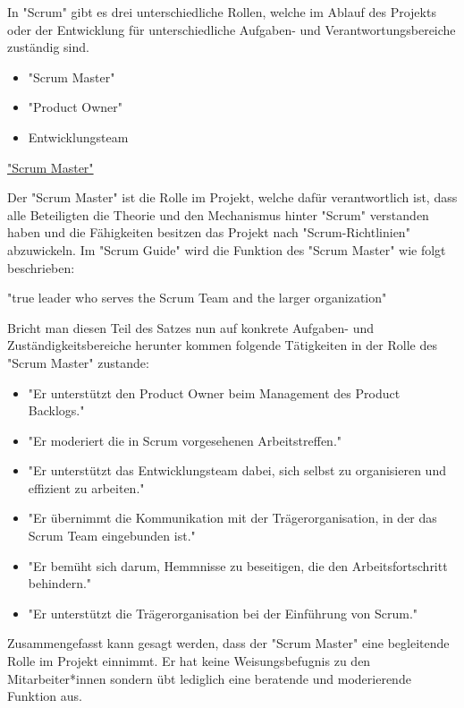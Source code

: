 
In "Scrum" gibt es drei unterschiedliche Rollen, welche im Ablauf des Projekts oder der Entwicklung für unterschiedliche Aufgaben- und Verantwortungsbereiche zuständig sind.

\begin{itemize}
    \item "Scrum Master"
    \item "Product Owner"
    \item Entwicklungsteam
\end{itemize}

\cite{Scrum}

\underline{"Scrum Master"}

Der "Scrum Master" ist die Rolle im Projekt, welche dafür verantwortlich ist, dass alle Beteiligten die Theorie und den Mechanismus hinter "Scrum" verstanden haben und die Fähigkeiten besitzen das Projekt nach "Scrum-Richtlinien" abzuwickeln. Im "Scrum Guide" wird die Funktion des "Scrum Master" wie folgt beschrieben: \cite{ScrumMaster}

"true leader who serves the Scrum Team and the larger organization" \cite{ScrumMaster}

Bricht man diesen Teil des Satzes nun auf konkrete Aufgaben- und Zuständigkeitsbereiche herunter kommen folgende Tätigkeiten in der Rolle des "Scrum Master" zustande:

\begin{itemize}
    \item "Er unterstützt den Product Owner beim Management des Product Backlogs." \cite{ScrumMaster}
    \item "Er moderiert die in Scrum vorgesehenen Arbeitstreffen." \cite{ScrumMaster}
    \item "Er unterstützt das Entwicklungsteam dabei, sich selbst zu organisieren und effizient zu arbeiten." \cite{ScrumMaster}
    \item "Er übernimmt die Kommunikation mit der Trägerorganisation, in der das Scrum Team eingebunden ist." \cite{ScrumMaster}
    \item "Er bemüht sich darum, Hemmnisse zu beseitigen, die den Arbeitsfortschritt behindern." \cite{ScrumMaster}
    \item "Er unterstützt die Trägerorganisation bei der Einführung von Scrum." \cite{ScrumMaster}
\end{itemize}

Zusammengefasst kann gesagt werden, dass der "Scrum Master" eine begleitende Rolle im Projekt einnimmt. Er hat keine Weisungsbefugnis zu den Mitarbeiter*innen sondern übt lediglich eine beratende und moderierende Funktion aus. \cite{ScrumMaster}

